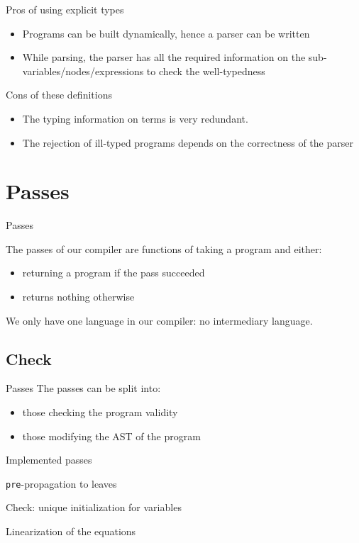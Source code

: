 \documentclass{beamer}
\begin{document}
\begin{frame}
	\begin{block}{Pros of using explicit types}
		\begin{itemize}
			\item Programs can be built dynamically, hence a parser can be
			written
			\item While parsing, the parser has all the required information on
			the sub-variables/nodes/expressions to check the well-typedness
		\end{itemize}
	\end{block}
	\begin{block}{Cons of these definitions}
		\begin{itemize}
			\item The typing information on terms is very redundant.
			\item The rejection of ill-typed programs depends on the correctness
			of the parser
		\end{itemize}
	\end{block}
\end{frame}

\section{Passes}
\begin{frame}{Passes}
	\begin{block}
		The passes of our compiler are functions of taking a program and either:
		\begin{itemize}
			\item returning a program if the pass succeeded
			\item returns nothing otherwise
		\end{itemize}

		We only have one language in our compiler: no intermediary language.
	\end{block}
\end{frame}

\subsection{Check}
\begin{frame}
	\begin{block}{Passes}
		The passes can be split into:
		\begin{itemize}
			\item those checking the program validity
			\item those modifying the AST of the program
		\end{itemize}
	\end{block}
\end{frame}

\begin{frame}{Implemented passes}
	\begin{block}{\texttt{pre}-propagation to leaves}
	\end{block}
	\begin{block}{Check: unique initialization for variables}
	\end{block}
	\begin{block}{Linearization of the equations}
	\end{block}
\end{frame}
\end{document}
